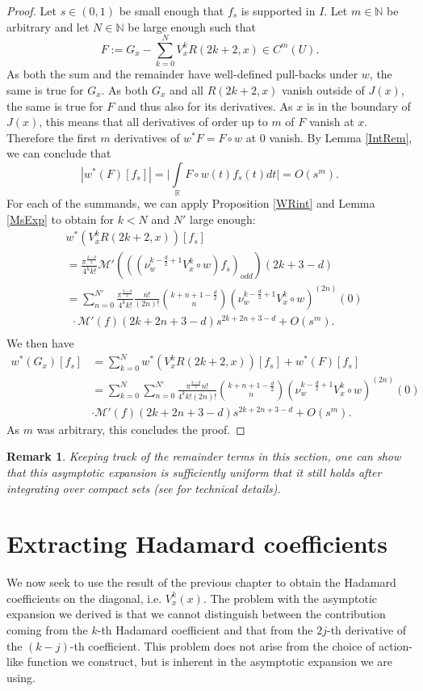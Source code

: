 \documentclass[11pt]{article}
\def\R{{\mathbb{R}}}
\def\N{{\mathbb{N}}}
\def\intR{\int\limits_\R}
\def\M{\mathcal{M}}
\newtheorem{rem}[df]{Remark}
\begin{document}
\begin{proof}
	 Let $s\in (0,1)$ be small enough that $f_s$ is supported in $I$. Let $m\in \N$ be arbitrary and let $N\in\N$ be large enough such that
	\[F:=G_x-\sum\limits_{k=0}^N V^k_xR(2k+2,x)\in C^m(U).\]
	As both the sum and the remainder have well-defined pull-backs under $w$, the same is true for $G_x$. As both $G_x$ and all $R(2k+2,x)$ vanish outside of $J(x)$, the same is true for $F$ and thus also for its derivatives. As $x$ is in the boundary of $J(x)$, this means that all derivatives of order up to $m$ of $F$ vanish at $x$. Therefore the first $m$ derivatives of $w^*F=F\circ w$ at 0 vanish.
	By Lemma \ref{IntRem}, we can conclude that
	\[|w^*(F)[f_s]|=\Big|\intR F\circ w(t)f_s(t)dt\Big|=O(s^m).\]
	For each of the summands, we can apply Proposition \ref{WRint} and Lemma \ref{MsExp} to obtain for $k<N$ and $N'$ large enough:
	\begin{align*}
		&w^*(V^k_xR(2k+2,x))[f_s]\\
		&=\frac{\pi^\frac{2-d}{2}}{4^kk!} \M'\left(\left((\nu_w^{k-\tfrac{d}{2}+1}V^k_x\circ w)f_s\right)_{odd}\right)({2k+3-d})\\
		&= \sum\limits_{n=0}^{N'}\frac{\pi^\frac{2-d}{2}}{4^kk!}\frac{n!}{(2n)!}\binom{k+n+1-\frac{d}{2}}{n}\left(\nu_w^{k-\tfrac{d}{2}+1}V^k_x\circ w\right)^{(2n)}(0)\\
		&\ \ \cdot\M'(f)({2k+2n+3-d})s^{2k+2n+3-d}+O(s^m).\\
	\end{align*}
	We then have
	\begin{align*}
		w^*(G_x)[f_s]&=\sum\limits_{k=0}^Nw^*(V^k_x R(2k+2,x))[f_s]+w^*(F)[f_s]\\
		&=\sum\limits_{k=0}^N\sum\limits_{n=0}^{N'}\frac{\pi^\frac{2-d}{2}n!}{4^kk!(2n)!} \binom{k+n+1-\frac{d}{2}}{n}\left(\nu_w^{k-\tfrac{d}{2}+1}V^k_x \circ w\right)^{(2n)}(0)\\&\cdot \M'(f)({2k+2n+3-d})s^{2k+2n+3-d}+O(s^m).
	\end{align*}
	As $m$ was arbitrary, this concludes the proof.
\end{proof}

\begin{rem}
	Keeping track of the remainder terms in this section, one can show that this asymptotic expansion is sufficiently uniform that it still holds after integrating over compact sets (see \cite[Theorem 4.2.15]{Ron} for technical details).
\end{rem}

\section{Extracting Hadamard coefficients}
\label{Hadamextract}
We now seek to use the result of the previous chapter to obtain the Hadamard coefficients on the diagonal, i.e. $V^{k}_x(x)$. The problem with the asymptotic expansion we derived is that we cannot distinguish between the contribution coming from the $k$-th Hadamard coefficient and that from the $2j$-th derivative of the $(k-j)$-th coefficient. This problem does not arise from the choice of action-like function we construct, but is inherent in the asymptotic expansion we are using.
\end{document}
